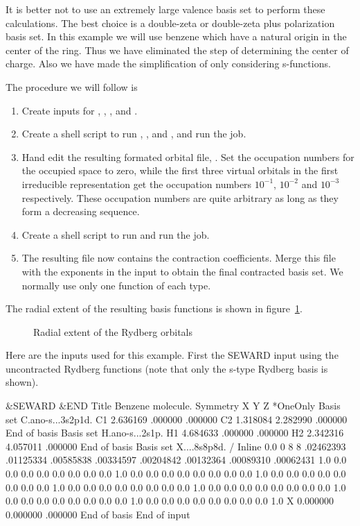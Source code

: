 It is better not to use an extremely large valence basis set to
perform these calculations. The best choice is a double-zeta or
double-zeta plus polarization basis set.
In this example we will use benzene which have a natural
origin in the center of the ring.
Thus we have eliminated the step of determining the
center of charge.
Also we have made the simplification of only considering s-functions.

The procedure we will follow is
\begin{enumerate}
\item
Create inputs for , , ,
and . 
\item
Create a shell script to run
, , and ,
and run the job. 
\item
Hand edit the resulting formated orbital file, .
Set the occupation numbers for the occupied space to zero, while
the first three virtual orbitals in the first irreducible representation
get the occupation numbers $10^{-1}$, $10^{-2}$ and $10^{-3}$
respectively. These occupation numbers are quite arbitrary as long
as they form a decreasing sequence.
\item
Create a shell script to run  and run the job. 
\item
The resulting file  now contains the contraction coefficients.
Merge this file with the exponents in the  input to obtain the final
contracted basis set. We normally use only one function of each type.
\end{enumerate}

The radial extent of the resulting basis functions is shown in
figure~\ref{fig:rydberg_orbitals}.

\begin{figure}[htbp]
\caption{\label{fig:rydberg_orbitals}Radial extent of the Rydberg orbitals}
\end{figure}

Here are the inputs used for this example. First the SEWARD input
using the uncontracted Rydberg functions (note that only the s-type Rydberg
basis is shown).
\begin{inputlisting}
 &SEWARD &END
Title
 Benzene molecule.
Symmetry
X Y Z
*OneOnly
Basis set
C.ano-s...3s2p1d.
C1    2.636169     .000000     .000000
C2    1.318084    2.282990     .000000
End of basis
Basis set
H.ano-s...2s1p.
H1    4.684633     .000000     .000000
H2    2.342316    4.057011     .000000
End of basis
Basis set
X....8s8p8d. / Inline
  0.0 0
8 8
.02462393 .01125334 .00585838 .00334597 .00204842 .00132364 .00089310 .00062431
1.0 0.0 0.0 0.0 0.0 0.0 0.0 0.0
0.0 1.0 0.0 0.0 0.0 0.0 0.0 0.0
0.0 0.0 1.0 0.0 0.0 0.0 0.0 0.0
0.0 0.0 0.0 1.0 0.0 0.0 0.0 0.0
0.0 0.0 0.0 0.0 1.0 0.0 0.0 0.0
0.0 0.0 0.0 0.0 0.0 1.0 0.0 0.0
0.0 0.0 0.0 0.0 0.0 0.0 1.0 0.0
0.0 0.0 0.0 0.0 0.0 0.0 0.0 1.0
X     0.000000    0.000000     .000000
End of basis
End of input
\end{inputlisting}

